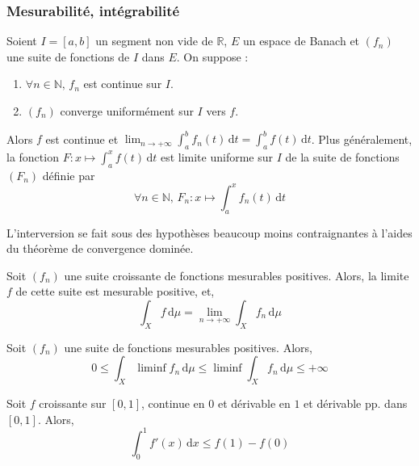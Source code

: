   \subsubsection{Mesurabilité, intégrabilité}


  \begin{theorem}
    Soient $I = [a,b]$ un segment non vide de $\mathbb{R}$, $E$ un espace de Banach et $(f_n)$ une suite de fonctions de $I$ dans $E$. On suppose :
    \begin{enumerate}[label=(\roman*)]
      \item $\forall n \in \mathbb{N}, \, f_n$ est continue sur $I$.
      \item $(f_n)$ converge uniformément sur $I$ vers $f$.
    \end{enumerate}
    Alors $f$ est continue et $\lim_{n \rightarrow +\infty} \int_a^b f_n(t) \, \mathrm{d}t = \int_a^b f(t) \, \mathrm{d}t$. Plus généralement, la fonction $F : x \mapsto \int_a^x f(t) \, \mathrm{d}t$ est limite uniforme sur $I$ de la suite de fonctions $(F_n)$ définie par
    \[ \forall n \in \mathbb{N}, \, F_n : x \mapsto \int_a^x f_n(t) \, \mathrm{d}t \]
  \end{theorem}

  \begin{remark}
    L'interversion se fait sous des hypothèses beaucoup moins contraignantes à l'aides du théorème de convergence dominée.
  \end{remark}


  \begin{theorem}
    Soit $(f_n)$ une suite croissante de fonctions mesurables positives. Alors, la limite $f$ de cette suite est mesurable positive, et,
    \[ \int_X f \, \mathrm{d}\mu = \lim_{n \rightarrow +\infty} \int_X f_n \, \mathrm{d}\mu \]
  \end{theorem}


  \begin{theorem}
    Soit $(f_n)$ une suite de fonctions mesurables positives. Alors,
    \[ 0 \leq \int_X \liminf f_n \, \mathrm{d}\mu \leq \liminf \int_X f_n \, \mathrm{d}\mu \leq +\infty \]
  \end{theorem}

  \begin{example}
    \label{241-1}
    Soit $f$ croissante sur $[0,1]$, continue en $0$ et dérivable en $1$ et dérivable pp. dans $[0,1]$. Alors,
    \[ \int_{0}^{1} f'(x) \, \mathrm{d}x \leq f(1) - f(0) \]
  \end{example}

